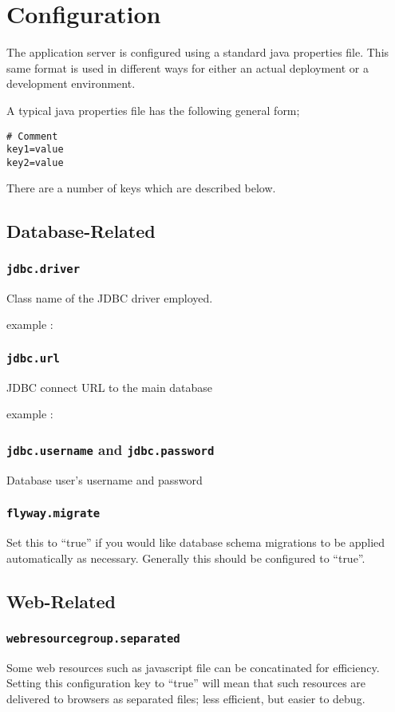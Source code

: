 \section{Configuration}
\label{config}

The application server is configured using a standard java properties file.  This same format is used in different ways for either an actual deployment or a development environment.

A typical java properties file has the following general form;

\begin{verbatim}
# Comment
key1=value
key2=value
\end{verbatim}

There are a number of keys which are described below.

\subsection{Database-Related}

\subsubsection{\tt jdbc.driver}

Class name of the JDBC driver employed.

example : 

\subsubsection{\tt jdbc.url}

JDBC connect URL to the main database

example : 

\subsubsection{{\tt jdbc.username} and {\tt jdbc.password}}

Database user's username and password

\subsubsection{\tt flyway.migrate}

Set this to ``true'' if you would like database schema migrations to be applied automatically as necessary.  Generally this should be configured to ``true''.

\subsection{Web-Related}

\subsubsection{\tt webresourcegroup.separated}

Some web resources such as javascript file can be concatinated for efficiency.  Setting this configuration key to ``true'' will mean that such resources are delivered to browsers as separated files; less efficient, but easier to debug.
